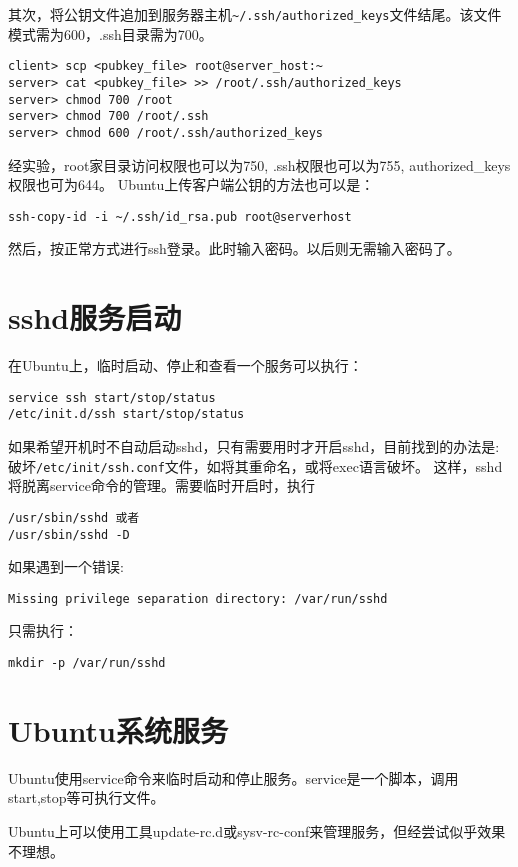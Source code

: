 其次，将公钥文件追加到服务器主机\verb+~/.ssh/authorized_keys+文件结尾。该文件模式需为600，.ssh目录需为700。
\begin{verbatim}
client> scp <pubkey_file> root@server_host:~
server> cat <pubkey_file> >> /root/.ssh/authorized_keys
server> chmod 700 /root
server> chmod 700 /root/.ssh
server> chmod 600 /root/.ssh/authorized_keys
\end{verbatim}
经实验，root家目录访问权限也可以为750, .ssh权限也可以为755, authorized\_keys权限也可为644。
Ubuntu上传客户端公钥的方法也可以是：
\begin{verbatim}
ssh-copy-id -i ~/.ssh/id_rsa.pub root@serverhost
\end{verbatim}


然后，按正常方式进行ssh登录。此时输入密码。以后则无需输入密码了。

\section{sshd服务启动}
在Ubuntu上，临时启动、停止和查看一个服务可以执行：
\begin{verbatim}
service ssh start/stop/status
/etc/init.d/ssh start/stop/status
\end{verbatim}

如果希望开机时不自动启动sshd，只有需要用时才开启sshd，目前找到的办法是:破坏\verb+/etc/init/ssh.conf+文件，如将其重命名，或将exec语言破坏。
这样，sshd将脱离service命令的管理。需要临时开启时，执行
\begin{verbatim}
/usr/sbin/sshd 或者
/usr/sbin/sshd -D
\end{verbatim}

如果遇到一个错误:
\begin{verbatim}
Missing privilege separation directory: /var/run/sshd
\end{verbatim}

只需执行：
\begin{verbatim}
mkdir -p /var/run/sshd
\end{verbatim}





\section{Ubuntu系统服务}

Ubuntu使用service命令来临时启动和停止服务。service是一个脚本，调用start,stop等可执行文件。

Ubuntu上可以使用工具update-rc.d或sysv-rc-conf来管理服务，但经尝试似乎效果不理想。


